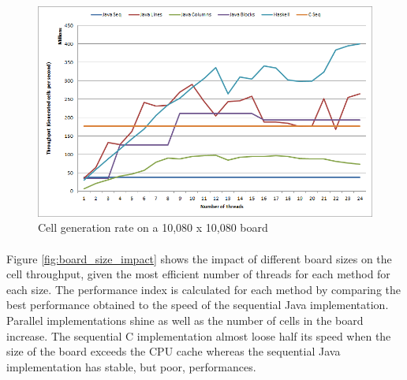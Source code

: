 \documentclass[a4paper]{article}
\begin{document}
    \begin{figure}[h]
        \centering
        \includegraphics[width=0.7\linewidth]{results/10080_throughput.png}
        \caption{
            Cell generation rate on a 10,080 x 10,080 board
            \label{fig:10080_throughput}
        }
    \end{figure}

    \paragraph{}Figure \ref{fig:board_size_impact} shows the impact of different
board sizes on the cell throughput, given the most efficient number of threads
for each method for each size. \newline
The performance index is calculated for each method by comparing the best
performance obtained to the speed of the sequential Java implementation.
Parallel implementations shine as well as the number of cells in the board
increase. The sequential C implementation almost loose half its speed when the
size of the board exceeds the CPU cache whereas the sequential Java
implementation has stable, but poor, performances.
\end{document}
